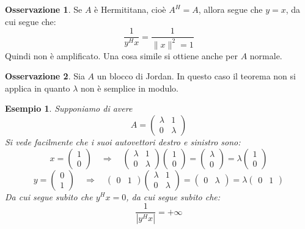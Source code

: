 \documentclass[11pt,a4paper,twoside]{article}
\newtheorem{es}{Esempio}
\theoremstyle{definition}
\newtheorem*{oss}{Osservazione}
\begin{document}
\begin{oss}
	Se $A$ è Hermititana, cioè $A^H=A$, allora segue che $y=x$, da cui segue che:
	\[\frac 1{y^Hx} = \frac 1{\|x\|^2 = 1}\]
	Quindi non è amplificato. Una cosa simile si ottiene anche per $A$ normale.
\end{oss}

\begin{oss}
	Sia $A$ un blocco di Jordan. In questo caso il teorema non si applica in quanto $\lambda$ non è semplice in modulo.
\end{oss}

\begin{es}
	Supponiamo di avere \[ A = \begin{pmatrix} \lambda & 1\\ 0 & \lambda \end{pmatrix}\]
	Si vede facilmente che i suoi autovettori destro e sinistro sono:
	\[x = \begin{pmatrix} 1\\ 0\end{pmatrix} \quad \Rightarrow \quad \begin{pmatrix} \lambda & 1\\ 0 & \lambda \end{pmatrix} \begin{pmatrix}1 \\ 0\end{pmatrix} = \begin{pmatrix}\lambda \\ 0\end{pmatrix} = \lambda  \begin{pmatrix} 1\\ 0\end{pmatrix} \]
	\[ y = \begin{pmatrix}0\\ 1\end{pmatrix} \quad \Rightarrow \quad \begin{pmatrix} 0 & 1\end{pmatrix} \begin{pmatrix} \lambda & 1\\ 0 & \lambda \end{pmatrix} = \begin{pmatrix} 0 & \lambda\end{pmatrix} = \lambda \begin{pmatrix} 0 & 1\end{pmatrix}\]
	Da cui segue subito che $y^Hx = 0$, da cui segue subito che:
	\[\frac 1{|y^Hx|} = + \infty\]
\end{es}
\end{document}
